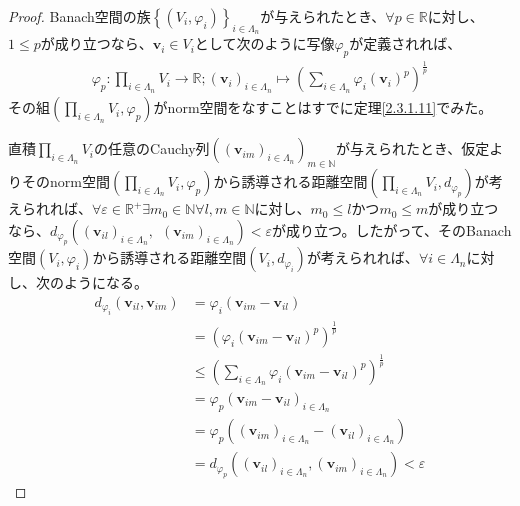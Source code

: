 \documentclass[dvipdfmx]{jsarticle}
\begin{document}
\begin{proof}
Banach空間の族$\left\{ \left( V_{i},\varphi_{i} \right) \right\}_{i \in \varLambda_{n}}$が与えられたとき、$\forall p \in \mathbb{R}$に対し、$1 \leq p$が成り立つなら、$\mathbf{v}_{i} \in V_{i}$として次のように写像$\varphi_{p}$が定義されれば、
\begin{align*}
\varphi_{p}:\prod_{i \in \varLambda_{n}} V_{i} \rightarrow \mathbb{R};\left( \mathbf{v}_{i} \right)_{i \in \varLambda_{n}} \mapsto \left( \sum_{i \in \varLambda_{n}} {\varphi_{i}\left( \mathbf{v}_{i} \right)}^{p} \right)^{\frac{1}{p}}
\end{align*}
その組$\left( \prod_{i \in \varLambda_{n}} V_{i},\varphi_{p} \right)$がnorm空間をなすことはすでに定理\ref{2.3.1.11}でみた。\par
直積$\prod_{i \in \varLambda_{n}} V_{i}$の任意のCauchy列$\left( \left( \mathbf{v}_{im} \right)_{i \in \varLambda_{n}} \right)_{m \in \mathbb{N}}$が与えられたとき、仮定よりそのnorm空間$\left( \prod_{i \in \varLambda_{n}} V_{i},\varphi_{p} \right)$から誘導される距離空間$\left( \prod_{i \in \varLambda_{n}} V_{i},d_{\varphi_{p}} \right)$が考えられれば、$\forall\varepsilon \in \mathbb{R}^{+}\exists m_{0} \in \mathbb{N}\forall l,m \in \mathbb{N}$に対し、$m_{0} \leq l$かつ$m_{0} \leq m$が成り立つなら、$d_{\varphi_{p}}\left( \left( \mathbf{v}_{il} \right)_{i \in \varLambda_{n}},\ \ \left( \mathbf{v}_{im} \right)_{i \in \varLambda_{n}} \right) < \varepsilon$が成り立つ。したがって、そのBanach空間$\left( V_{i},\varphi_{i} \right)$から誘導される距離空間$\left( V_{i},d_{\varphi_{i}} \right)$が考えられれば、$\forall i \in \varLambda_{n}$に対し、次のようになる。
\begin{align*}
d_{\varphi_{i}}\left( \mathbf{v}_{il},\mathbf{v}_{im} \right) &= \varphi_{i}\left( \mathbf{v}_{im} - \mathbf{v}_{il} \right)\\
&= \left( {\varphi_{i}\left( \mathbf{v}_{im} - \mathbf{v}_{il} \right)}^{p} \right)^{\frac{1}{p}}\\
&\leq \left( \sum_{i \in \varLambda_{n}} {\varphi_{i}\left( \mathbf{v}_{im} - \mathbf{v}_{il} \right)}^{p} \right)^{\frac{1}{p}}\\
&= \varphi_{p}\left( \mathbf{v}_{im} - \mathbf{v}_{il} \right)_{i \in \varLambda_{n}}\\
&= \varphi_{p}\left( \left( \mathbf{v}_{im} \right)_{i \in \varLambda_{n}} - \left( \mathbf{v}_{il} \right)_{i \in \varLambda_{n}} \right)\\
&= d_{\varphi_{p}}\left( \left( \mathbf{v}_{il} \right)_{i \in \varLambda_{n}},\left( \mathbf{v}_{im} \right)_{i \in \varLambda_{n}} \right) < \varepsilon

\end{align*}
\end{proof}
\end{document}
